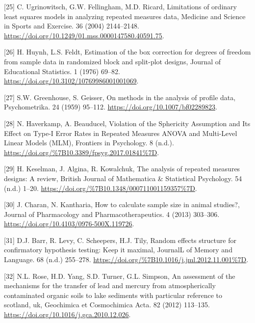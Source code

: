 \documentclass[
]{article}
\begin{document}
\leavevmode\hypertarget{ref-ugrinowitsch2004}{}%
{[}25{]} C. Ugrinowitsch, G.W. Fellingham, M.D. Ricard, Limitations of ordinary least squares models in analyzing repeated measures data, Medicine and Science in Sports and Exercise. 36 (2004) 2144--2148. \url{https://doi.org/10.1249/01.mss.0000147580.40591.75}.

\leavevmode\hypertarget{ref-huynh1976}{}%
{[}26{]} H. Huynh, L.S. Feldt, Estimation of the box correction for degrees of freedom from sample data in randomized block and split-plot designs, Journal of Educational Statistics. 1 (1976) 69--82. \url{https://doi.org/10.3102/10769986001001069}.

\leavevmode\hypertarget{ref-greenhouse1959}{}%
{[}27{]} S.W. Greenhouse, S. Geisser, On methods in the analysis of profile data, Psychometrika. 24 (1959) 95--112. \url{https://doi.org/10.1007/bf02289823}.

\leavevmode\hypertarget{ref-haverkamp2017}{}%
{[}28{]} N. Haverkamp, A. Beauducel, Violation of the Sphericity Assumption and Its Effect on Type-I Error Rates in Repeated Measures ANOVA and Multi-Level Linear Models (MLM), Frontiers in Psychology. 8 (n.d.). \url{https://doi.org/\%7B10.3389/fpsyg.2017.01841\%7D}.

\leavevmode\hypertarget{ref-keselman2001}{}%
{[}29{]} H. Keselman, J. Algina, R. Kowalchuk, The analysis of repeated measures designs: A review, British Journal of Mathematica \& Statistical Psychology. 54 (n.d.) 1--20. \url{https://doi.org/\%7B10.1348/000711001159357\%7D}.

\leavevmode\hypertarget{ref-charan2013}{}%
{[}30{]} J. Charan, N. Kantharia, How to calculate sample size in animal studies?, Journal of Pharmacology and Pharmacotherapeutics. 4 (2013) 303--306. \url{https://doi.org/10.4103/0976-500X.119726}.

\leavevmode\hypertarget{ref-barr2013}{}%
{[}31{]} D.J. Barr, R. Levy, C. Scheepers, H.J. Tily, Random effects structure for confirmatory hypothesis testing: Keep it maximal, JournalL of Memory and Language. 68 (n.d.) 255--278. \url{https://doi.org/\%7B10.1016/j.jml.2012.11.001\%7D}.

\leavevmode\hypertarget{ref-rose2012}{}%
{[}32{]} N.L. Rose, H.D. Yang, S.D. Turner, G.L. Simpson, An assessment of the mechanisms for the transfer of lead and mercury from atmospherically contaminated organic soils to lake sediments with particular reference to scotland, uk, Geochimica et Cosmochimica Acta. 82 (2012) 113--135. \url{https://doi.org/10.1016/j.gca.2010.12.026}.
\end{document}
